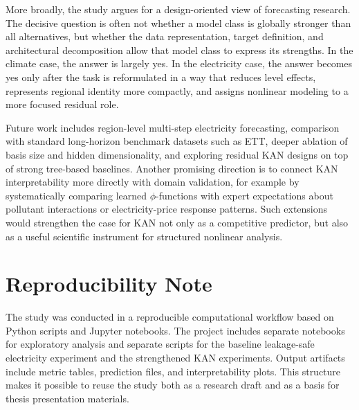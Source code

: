 \documentclass[10pt,conference,onecolumn]{IEEEtran}
\begin{document}
More broadly, the study argues for a design-oriented view of forecasting research. The decisive question is often not whether a model class is globally stronger than all alternatives, but whether the data representation, target definition, and architectural decomposition allow that model class to express its strengths. In the climate case, the answer is largely yes. In the electricity case, the answer becomes yes only after the task is reformulated in a way that reduces level effects, represents regional identity more compactly, and assigns nonlinear modeling to a more focused residual role.

Future work includes region-level multi-step electricity forecasting, comparison with standard long-horizon benchmark datasets such as ETT, deeper ablation of basis size and hidden dimensionality, and exploring residual KAN designs on top of strong tree-based baselines. Another promising direction is to connect KAN interpretability more directly with domain validation, for example by systematically comparing learned $\phi$-functions with expert expectations about pollutant interactions or electricity-price response patterns. Such extensions would strengthen the case for KAN not only as a competitive predictor, but also as a useful scientific instrument for structured nonlinear analysis.

\section*{Reproducibility Note}

The study was conducted in a reproducible computational workflow based on Python scripts and Jupyter notebooks. The project includes separate notebooks for exploratory analysis and separate scripts for the baseline leakage-safe electricity experiment and the strengthened KAN experiments. Output artifacts include metric tables, prediction files, and interpretability plots. This structure makes it possible to reuse the study both as a research draft and as a basis for thesis presentation materials.



\end{document}
